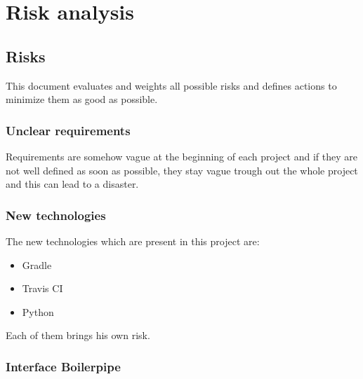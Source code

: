 
\chapter{Risk analysis} %

\label{ChapterX} %



\section{Risks}

This document evaluates and weights all possible risks and defines actions to minimize them as good as possible.

\subsection{Unclear requirements}

Requirements are somehow vague at the beginning of each project and if they are not well defined as soon as possible, they stay vague trough out the whole project and this can lead to a disaster. 

\subsection{New technologies}

The new technologies which are present in this project are:

 \begin{itemize}
    \item Gradle
    \item Travis CI
    \item Python
\end{itemize}

Each of them brings his own risk.

\subsection{Interface Boilerpipe}


